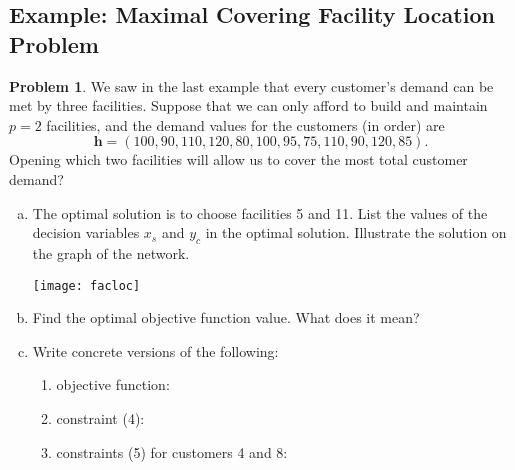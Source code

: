 \documentclass[11pt]{article}
\theoremstyle{definition}
\newtheorem{problem}{Problem}
\newcommand{\answerbox}[3]{%
  \fbox{%
    \begin{minipage}[#1]{#2}
      \hfill\vspace{#3}
    \end{minipage}
  }
}
\newcommand{\answerboxone}[2]{%
  \answerbox{#1}{6.0in}{#2} 
}
\newcommand{\answerboxtwo}[2]{%
  \answerbox{#1}{5.8in}{#2}
}
\begin{document}
\newpage
\subsection{Example:  Maximal Covering Facility Location Problem}

\begin{problem}
We saw in the last example that every customer's demand can be met by three facilities.  Suppose that we can only afford to build and maintain $p = 2$ facilities, and the demand values for the customers (in order) are 
\[
\textbf{h} = (100, 90, 110, 120, 80, 100, 95, 75, 110, 90, 120, 85).
\]
Opening which two facilities will allow us to cover the most total customer demand?
\end{problem}

\bigskip

\begin{enumerate}[(a)]
\item The optimal solution is to choose facilities 5 and 11.  List the values of the decision variables $x_s$ and $y_c$ in the optimal solution.  Illustrate the solution on the graph of the network.

\hfill \texttt{[image: facloc]}

\item Find the optimal objective function value.  What does it mean?
	
\answerboxone{c}{1cm}

\item Write concrete versions of the following:
\begin{enumerate}[i]
\item objective function:

\answerboxtwo{c}{1cm}

\item constraint (4):

\answerboxtwo{c}{1cm}

\item constraints (5) for customers 4 and 8:

\answerboxtwo{c}{2cm}
\end{enumerate}
\end{enumerate}
\end{document}
